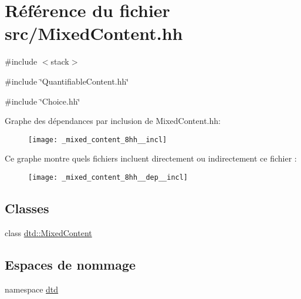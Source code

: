 \hypertarget{_mixed_content_8hh}{
\section{Référence du fichier src/MixedContent.hh}
\label{_mixed_content_8hh}
}
{\ttfamily \#include $<$stack$>$}\par
{\ttfamily \#include \char`\"{}QuantifiableContent.hh\char`\"{}}\par
{\ttfamily \#include \char`\"{}Choice.hh\char`\"{}}\par
Graphe des dépendances par inclusion de MixedContent.hh:\nopagebreak
\begin{figure}[H]
\begin{center}
\leavevmode
\texttt{[image: \_mixed\_content\_8hh\_\_incl]}
\end{center}
\end{figure}
Ce graphe montre quels fichiers incluent directement ou indirectement ce fichier :\nopagebreak
\begin{figure}[H]
\begin{center}
\leavevmode
\texttt{[image: \_mixed\_content\_8hh\_\_dep\_\_incl]}
\end{center}
\end{figure}
\subsection*{Classes}
\begin{DoxyCompactItemize}
\item 
class \hyperlink{classdtd_1_1_mixed_content}{dtd::MixedContent}
\end{DoxyCompactItemize}
\subsection*{Espaces de nommage}
\begin{DoxyCompactItemize}
\item 
namespace \hyperlink{namespacedtd}{dtd}
\end{DoxyCompactItemize}

